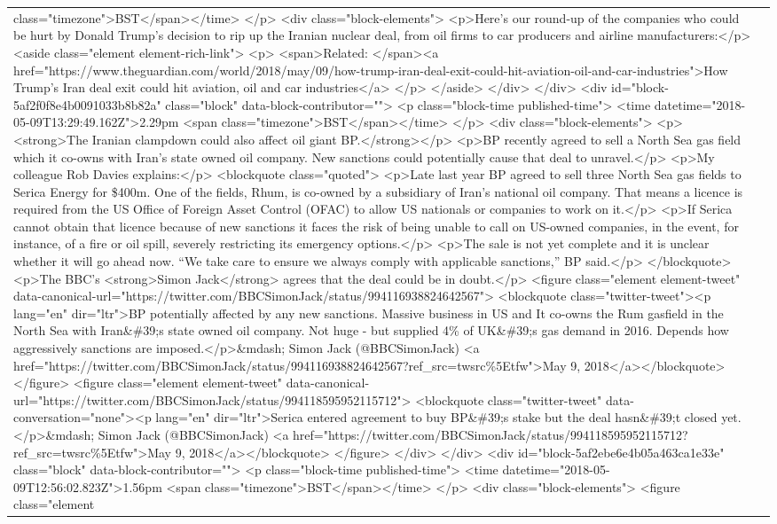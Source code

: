 \documentclass[]{article}
\begin{document}
\begin{table}[!h]
{\begin{tabular}[t]{ll}
class="timezone">BST</span></time> </p>    <div class="block-elements">  <p>Here’s our round-up of the companies who could be hurt by Donald Trump’s decision to rip up the Iranian nuclear deal, from oil firms to car producers and airline manufacturers:</p> <aside class="element element-rich-link"> <p> <span>Related: </span><a href="https://www.theguardian.com/world/2018/may/09/how-trump-iran-deal-exit-could-hit-aviation-oil-and-car-industries">How Trump's Iran deal exit could hit aviation, oil and car industries</a> </p> </aside> </div>   </div> <div id="block-5af2f0f8e4b0091033b8b82a" class="block" data-block-contributor=""> <p class="block-time published-time"> <time datetime="2018-05-09T13:29:49.162Z">2.29pm <span class="timezone">BST</span></time> </p>    <div class="block-elements">  <p><strong>The Iranian clampdown could also affect oil giant BP.</strong></p> <p>BP recently agreed to sell a North Sea gas field which it co-owns with Iran’s state owned oil company. New sanctions could potentially cause that deal to unravel.</p> <p>My colleague Rob Davies explains:</p> <blockquote class="quoted"> <p>Late last year BP agreed to sell three North Sea gas fields to Serica Energy for \$400m. One of the fields, Rhum, is co-owned by a subsidiary of Iran’s national oil company. That means a licence is required from the US Office of Foreign Asset Control (OFAC) to allow US nationals or companies to work on it.</p> <p>If Serica cannot obtain that licence because of new sanctions it faces the risk of being unable to call on US-owned companies, in the event, for instance, of a fire or oil spill, severely restricting its emergency options.</p> <p>The sale is not yet complete and it is unclear whether it will go ahead now. “We take care to ensure we always comply with applicable sanctions,” BP said.</p> </blockquote> <p>The BBC’s <strong>Simon Jack</strong> agrees that the deal could be in doubt.</p>  <figure class="element element-tweet" data-canonical-url="https://twitter.com/BBCSimonJack/status/994116938824642567">  <blockquote class="twitter-tweet"><p lang="en" dir="ltr">BP potentially affected by any new sanctions. Massive business in US and It co-owns the Rum gasfield in the North Sea with Iran\&\#39;s state owned oil company. Not huge - but supplied 4\% of UK\&\#39;s gas demand in 2016. Depends how aggressively sanctions are imposed.</p>\&mdash; Simon Jack (@BBCSimonJack) <a href="https://twitter.com/BBCSimonJack/status/994116938824642567?ref\_src=twsrc\%5Etfw">May 9, 2018</a></blockquote>  </figure>  <figure class="element element-tweet" data-canonical-url="https://twitter.com/BBCSimonJack/status/994118595952115712">  <blockquote class="twitter-tweet" data-conversation="none"><p lang="en" dir="ltr">Serica entered agreement to buy BP\&\#39;s stake but the deal hasn\&\#39;t closed yet.</p>\&mdash; Simon Jack (@BBCSimonJack) <a href="https://twitter.com/BBCSimonJack/status/994118595952115712?ref\_src=twsrc\%5Etfw">May 9, 2018</a></blockquote>  </figure> </div>   </div> <div id="block-5af2ebe6e4b05a463ca1e33e" class="block" data-block-contributor=""> <p class="block-time published-time"> <time datetime="2018-05-09T12:56:02.823Z">1.56pm <span class="timezone">BST</span></time> </p>    <div class="block-elements">  <figure class="element 
\end{tabular}}
\end{table}
\end{document}
